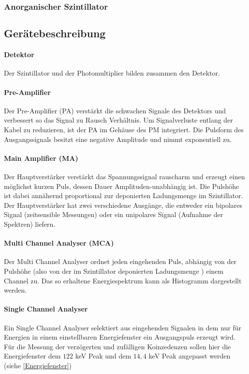 \documentclass[12pt,listof=totoc]{scrartcl}
\begin{document}
 \subsubsection{Anorganischer Szintillator}
 
 \subsection{Gerätebeschreibung}
 \paragraph{Detektor} Der Szintillator und der Photomultiplier bilden zusammen den Detektor.
 \paragraph{Pre-Amplifier}
 Der Pre-Amplifier (PA) verstärkt die schwachen Signale des Detektors und verbessert so
 das Signal zu Rausch Verhältnis. Um Signalverluste entlang der Kabel zu reduzieren, ist der PA im Gehäuse des PM integriert. Die Pulsform des Ausgangssignals besitzt eine negative Amplitude und nimmt exponentiell zu.
 \paragraph{Main Amplifier (MA)}
 Der Hauptverstärker  verstärkt das Spannungssignal rauscharm und erzeugt einen möglichst kurzen Puls, dessen Dauer Amplituden-unabhängig ist. Die Pulshöhe ist dabei annähernd proportional zur deponierten Ladungsmenge im Szintillator. Der Hauptverstärker hat zwei verschiedene Ausgänge, die entweder ein bipolares Signal (zeitsensible Messungen) oder ein unipolares Signal (Aufnahme der Spektren) liefern.
 \paragraph{Multi Channel Analyser (MCA)}
 Der Multi Channel Analyser ordnet jeden eingehenden Puls, abhängig von der Pulshöhe (also von der im Szintillator deponierten Ladungsmenge ) einem Channel zu. Das so erhaltene Energiespektrum kann als Histogramm dargestellt werden.
 \paragraph{Single Channel Analyser}
 Ein Single Channel Analyser selektiert aus eingehenden Signalen in dem nur für Energien in einem einstellbaren Energiefenster ein Ausgangspuls erzeugt wird.  Für die Messung der verzögerten und zufälligen Koinzedenzen sollen hier die Energiefenster dem $122$ keV Peak und dem $14,4$ keV Peak angepasst werden (siehe \ref{Energiefenster})
\end{document}
